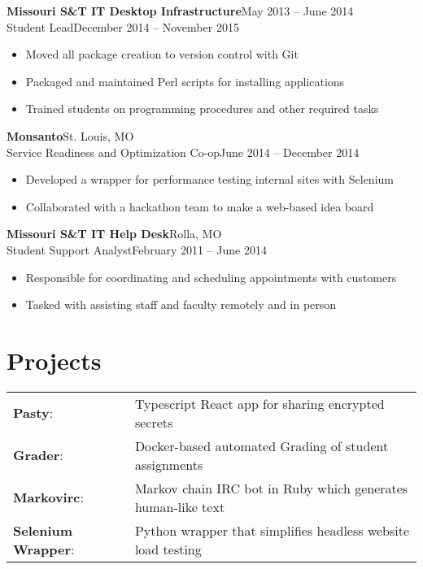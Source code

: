 \documentclass[margin]{res}
\newcommand{\github}[0]%
{%
  \hspace{-4mm}\faIcon{github}\hspace{1mm}%
}
\begin{document}
\begin{resume}
       \textbf{Missouri S\&T IT Desktop Infrastructure}\hfill May 2013 -- June 2014\\
       Student Lead\hfill December 2014 -- November 2015
       \begin{itemize} \itemsep -1pt  %
         \item Moved all package creation to version control with Git
         \item Packaged and maintained Perl scripts for installing applications
         \item Trained students on programming procedures and other required tasks
       \end{itemize}

       \textbf{Monsanto}\hfill St. Louis, MO\\
       Service Readiness and Optimization Co-op\hfill June 2014 -- December 2014
       \begin{itemize} \itemsep -1pt  %
         \item Developed a wrapper for performance testing internal sites with Selenium
         \item Collaborated with a hackathon team to make a web-based idea board
       \end{itemize}

       \textbf{Missouri S\&T IT Help Desk}\hfill Rolla, MO\\
       Student Support Analyst\hfill February 2011 -- June 2014
       \begin{itemize} \itemsep -1pt  %
         \item Responsible for coordinating and scheduling appointments with customers
         \item Tasked with assisting staff and faculty remotely and in person
       \end{itemize}

    \section{Projects}
      \begin{tabular}{l p{4in}}
        \github\textbf{Pasty}:                & Typescript React app for sharing encrypted secrets \\ [1pt]
        \github\textbf{Grader}:               & Docker-based automated Grading of student assignments \\ [1pt]
        \github\textbf{Markovirc}:            & Markov chain IRC bot in Ruby which generates human-like text \\ [1pt]
        \github\textbf{Selenium Wrapper}:     & Python wrapper that simplifies headless website load testing \\ [1pt]
      \end{tabular}


\end{resume}
\end{document}
